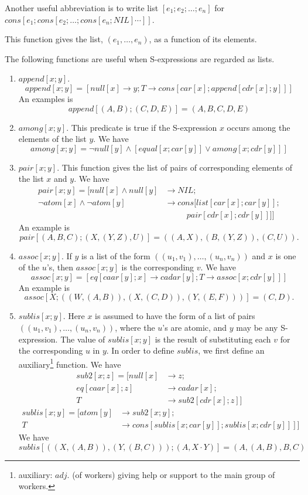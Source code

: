 \documentclass[11pt, a4paper]{article}
\begin{document}
Another useful abbreviation is to write list $[e_1; e_2; \ldots; e_n]$ for\\
{$cons[e_1; cons[e_2; \ldots; cons[e_n; NIL] \cdots ]]$}.

This function gives the list, $(e_1, \ldots, e_n)$, as a function of its
elements.

The following functions are useful when S-expressions are regarded as lists.
\begin{enumerate}
\item $append[x; y]$.
  $$ append[x; y] = [null[x] \to y; T \to cons[car[x]; append[cdr[x]; y]]] $$
  An examples is
  $$ append[(A, B); (C, D, E)] = (A, B, C, D, E) $$
\item $among[x; y]$. This predicate is true if the S-expression $x$ occurs among
  the elements of the list $y$. We have
  $$ among[x; y] =
     \lnot null[y] \land [equal[x; car[y]] \lor among[x; cdr[y]]] $$
\item $pair[x; y]$. This function gives the list of pairs of corresponding
  elements of the list $x$ and $y$. We have
  \begin{align*}
    pair[x; y] = [null[x] \land null[y] &\to NIL;                       \\
      \lnot atom[x] \land \lnot atom[y] &\to cons[list[car[x]; car[y]]; \\
                                &\ \ \ \ \ \ \ \ \ \ \ \ pair[cdr[x]; cdr[y]]]]
  \end{align*}
  An example is
  $$ pair[(A, B, C); (X, (Y, Z), U)] = ((A, X), (B, (Y, Z)), (C, U)) \text{.} $$
\item $assoc[x; y]$. If $y$ is a list of the form $((u_1, v_1), \ldots, (u_n,
  v_n))$ and $x$ is one of the $u$'s, then $assoc[x; y]$ is the corresponding
  $v$. We have
  $$ assoc[x; y] = [eq[caar[y]; x] \to cadar[y]; T \to assoc[x; cdr[y]]] $$
  An example is
  $$ assoc[X; ((W, (A, B)), (X, (C, D)), (Y, (E, F)))] = (C, D) \text{.} $$
\item $sublis[x; y]$. Here $x$ is assumed to have the form of a list of pairs
  $((u_1, v_1), \ldots, (u_n, v_n))$, where the $u$'s are atomic, and $y$ may be
  any S-expression. The value of $sublis[x; y]$ is the result of substituting
  each $v$ for the corresponding $u$ in $y$. In order to define $sublis$, we
  first define an
  auxiliary\footnote{auxiliary: $adj.$ (of workers) giving help or support to
    the main group of workers.}
  function. We have
  \begin{align*}
  sub2[x; z] = [null[x] &\to z;        \\
         eq[caar[x]; z] &\to cadar[x]; \\
                      T &\to sub2[cdr[x]; z]]
  \end{align*}
  \begin{align*}
  sublis[x; y] = [atom[y] &\to sub2[x; y]; \\
                        T &\to cons[sublis[x; car[y]]; sublis[x; cdr[y]]]]
  \end{align*}
  We have
  $$ sublis[((X, (A, B)), (Y, (B, C))); (A, X \cdot Y)] = (A, (A, B), B, C) $$
\end{enumerate}
\end{document}
